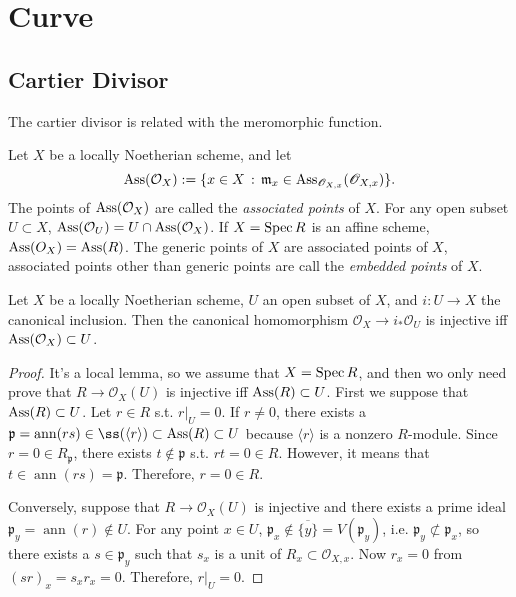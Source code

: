 \chapter{Curve}

\section{Cartier Divisor}

The cartier divisor is related with the meromorphic function.

\begin{defi}
Let $X$ be a locally Noetherian scheme, and let
\[
	\operatorname{Ass}(\mathcal O_X) := \{ x\in X\,:\,
		\mathfrak m_x\in \operatorname{Ass}_{\mathscr O_{X,x}}(\mathscr O_{X,x})
	\}.
\]
The points of $\operatorname{Ass}(\mathcal O_X)$ are called the \textit{associated points} 
of $X$. For any open subset $U\subset X$, $\operatorname{Ass}(\mathcal O_U)=U\cap \operatorname{Ass}(\mathcal O_X)$.
If $X=\operatorname{Spec} R$ is an affine scheme, $\operatorname{Ass}(O_X)=\operatorname{Ass}(R)$.
The generic points of $X$ are associated points of $X$, associated points other than
generic points are call the \textit{embedded points} of $X$.
\end{defi} 


\begin{lem}
Let $X$ be a locally Noetherian scheme, $U$ an open subset of $X$, and 
$i:U\to X$ the canonical inclusion. Then the canonical homomorphism 
$\mathcal O_X\to i_*\mathcal O_U$ is injective iff $\operatorname{Ass}(\mathcal O_X)\subset U$.
\end{lem}

\begin{proof}
It's a local lemma, so we assume that $X=\operatorname{Spec} R$, and then wo only need prove 
that $R\to \mathcal O_X(U)$ is injective iff $\operatorname{Ass}(R)\subset U$.
First we suppose that $\operatorname{Ass}(R)\subset U$. Let $r\in R$ s.t. $r|_U=0$. If $r\neq 0$,
there exists a $\mathfrak p=\operatorname{ann}(rs)\in \ss(\langle r\rangle)
\subset \Ass(R)\subset U$
because $\langle r\rangle$ is a nonzero $R$-module. Since $r=0 \in R_{\mathfrak p}$,
there exists $t\not\in \mathfrak p$ s.t. $rt=0\in R$. However, it means that
$t\in \operatorname{ann}(rs)=\mathfrak p$. Therefore, $r=0\in R$.

Conversely, suppose that $R\to \mathcal O_X(U)$ is injective and there exists a 
prime ideal $\mathfrak p_y = \operatorname{ann}(r)\not\in U$. For any point $x\in U$,
$\mathfrak p_x\not\in \overline{\{y\}}=V(\mathfrak p_y)$, i.e. 
$\mathfrak p_y \not\subset \mathfrak p_x$, so there exists a $s\in \mathfrak p_y$ 
such that $s_x$ is a unit of $R_x\subset \mathcal O_{X,x}$. Now $r_x=0$ from 
$(sr)_x=s_xr_x=0$. Therefore, $r|_U=0$.
\end{proof}

